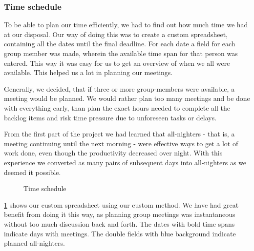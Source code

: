 \subsubsection{Time schedule}
To be able to plan our time efficiently, we had to find out how much time we had at our disposal. Our way of doing this was to create a custom spreadsheet, containing all the dates until the final deadline. For each date a field for each group member was made, wherein the available time span for that person was entered. This way it was easy for us to get an overview of when we all were available. This helped us a lot in planning our meetings.

Generally, we decided, that if three or more group-members were available, a meeting would be planned. We would rather plan too many meetings and be done with everything early, than plan the exact hours needed to complete all the backlog items and risk time pressure due to unforeseen tasks or delays.

From the first part of the project we had learned that all-nighters - that is, a meeting continuing until the next morning - were effective ways to get a lot of work done, even though the productivity decreased over night. With this experience we converted as many pairs of subsequent days into all-nighters as we deemed it possible.

\begin{figure}[H]
  \caption{Time schedule}
  \label{time schedule}
\end{figure}

\cref{time schedule} shows our custom spreadsheet using our custom method. We have had great benefit from doing it this way, as planning group meetings was instantaneous without too much discussion back and forth. The dates with bold time spans indicate days with meetings. The double fields with blue background indicate planned all-nighters.